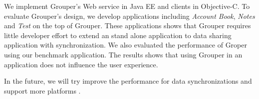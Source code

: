 \documentclass[twocolumn,10pt]{article}
\begin{document}
We implement Grouper's Web service in Java EE and clients in Objective-C. 
To evaluate Grouper's design, we develop applications including \emph{Account Book}, \emph{Notes} and \emph{Test} on the top of Grouper.
These applications shows that Grouper requires little developer effort to extend an stand alone application to data sharing application with synchronization.
We also evaluated the performance of Groper using our benchmark application.
The results shows that using Grouper in an application does not influence the user experience.

In the future, we will try improve the performance for data synchronizations and support more platforms .


{
	\footnotesize
	
}
\end{document}
